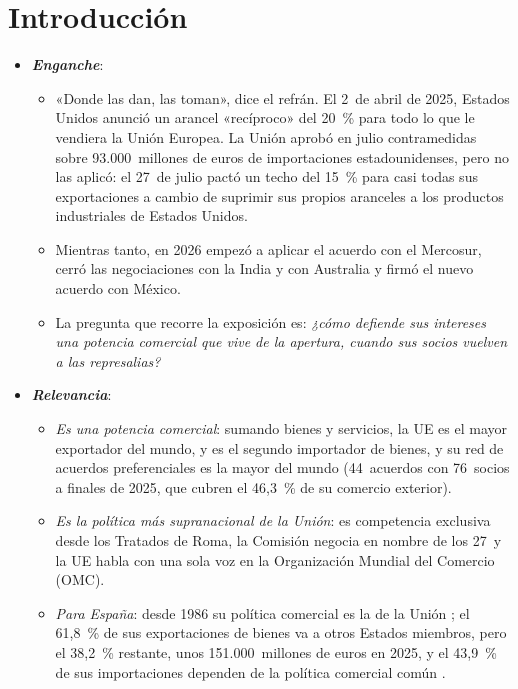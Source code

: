 \documentclass[11pt]{article}
\begin{document}
\tceetitulo

\section*{Introducción}

\begin{itemize}
\item \textbf{\emph{Enganche}}:
  \begin{itemize}
  \item «Donde las dan, las toman», dice el refrán. El 2~de abril de 2025, Estados Unidos anunció un arancel «recíproco» del 20~\% para todo lo que le vendiera la Unión Europea. La Unión aprobó en julio contramedidas sobre 93.000~millones de euros de importaciones estadounidenses, pero no las aplicó: el 27~de julio pactó un techo del 15~\% para casi todas sus exportaciones a cambio de suprimir sus propios aranceles a los productos industriales de Estados Unidos\nocite{UE2025DeclaracionEEUU,CE2026Contramedidas}.
  \item Mientras tanto, en 2026 empezó a aplicar el acuerdo con el Mercosur, cerró las negociaciones con la India y con Australia y firmó el nuevo acuerdo con México\nocite{CE2026Informe}.
  \item La pregunta que recorre la exposición es: \emph{¿cómo defiende sus intereses una potencia comercial que vive de la apertura, cuando sus socios vuelven a las represalias?}
  \end{itemize}

\item \textbf{\emph{Relevancia}}:
  \begin{itemize}
  \item \emph{Es una potencia comercial}: sumando bienes y servicios, la UE es el mayor exportador del mundo, y es el segundo importador de bienes, y su red de acuerdos preferenciales es la mayor del mundo (44~acuerdos con 76~socios a finales de 2025, que cubren el 46,3~\% de su comercio exterior)\nocite{CE2026Informe}.
  \item \emph{Es la política más supranacional de la Unión}: es competencia exclusiva desde los Tratados de Roma, la Comisión negocia en nombre de los 27~y la UE habla con una sola voz en la Organización Mundial del Comercio (OMC).
  \item \emph{Para España}: desde 1986 su política comercial es la de la Unión ; el 61,8~\% de sus exportaciones de bienes va a otros Estados miembros, pero el 38,2~\% restante, unos 151.000~millones de euros en 2025, y el 43,9~\% de sus importaciones dependen de la política comercial común\nocite{Eurostat2026Espana}  .
  \end{itemize}


\end{itemize}
\end{document}
